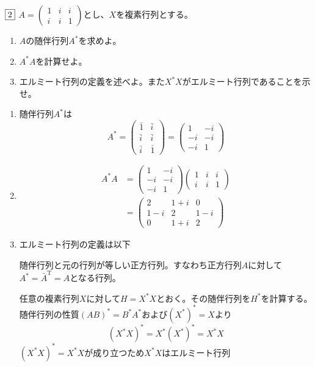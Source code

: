 \documentclass[dvipdfmx]{jsreport}
\begin{document}
\begin{tcolorbox} %
	$\fbox{2}$ $A= \begin{pmatrix}1& i& i\\ i& i& 1\end{pmatrix}$とし、$X$を複素行列とする。
\begin{enumerate}
	\item $A$の随伴行列$A^{*}$を求めよ。
	\item $A^{*}A$を計算せよ。
	\item エルミート行列の定義を述べよ。また$X^{*}X$がエルミート行列であることを示せ。
\end{enumerate}
\end{tcolorbox}

\begin{souanswer} %
\begin{enumerate}
	\item 随伴行列$A^{*}$は
\begin{equation*}
	A^{*}= 
\begin{pmatrix}
	\bar{1}& \bar{i}\\
	\bar{i}& \bar{i}\\
	\bar{i}& \bar{1}
\end{pmatrix}
	=
\begin{pmatrix}
	1& -i\\
	-i& -i\\
	-i& 1
\end{pmatrix}
\end{equation*}
	\item
\begin{align*}
	A^{*}A
	&=
\begin{pmatrix}
	1& -i\\
	-i& -i\\
	-i& 1
\end{pmatrix}
\begin{pmatrix}
	1& i& i\\
	i& i& 1
\end{pmatrix}\\
	&= 
\begin{pmatrix}
	2& 1+ i& 0\\
	1- i& 2& 1- i\\
	0& 1+ i& 2
\end{pmatrix}
\end{align*}
	\item エルミート行列の定義は以下
\begin{tcolorbox}
	随伴行列と元の行列が等しい正方行列。すなわち正方行列$A$に対して$A^*= \bar{A}^\mathrm{T}= A$となる行列。
\end{tcolorbox}
	任意の複素行列$X$に対して$H= X^*X$とおく。その随伴行列を$H^*$を計算する。随伴行列の性質$(AB)^*= B^*A^*$および$(X^*)^*= X$より
\begin{equation*}
	(X^*X)^*= X^*(X^*)^*= X^*X
\end{equation*}
	$(X^*X)^*= X^*X$が成り立つため$X^*X$はエルミート行列

\end{enumerate}
\end{souanswer}
\end{document}
